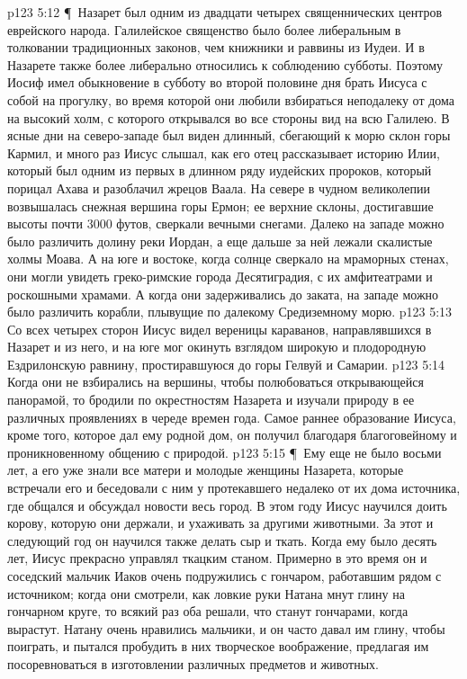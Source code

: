\vs p123 5:12 \P\ Назарет был одним из двадцати четырех священнических центров еврейского народа. Галилейское священство было более либеральным в толковании традиционных законов, чем книжники и раввины из Иудеи. И в Назарете также более либерально относились к соблюдению субботы. Поэтому Иосиф имел обыкновение в субботу во второй половине дня брать Иисуса с собой на прогулку, во время которой они любили взбираться неподалеку от дома на высокий холм, с которого открывался во все стороны вид на всю Галилею. В ясные дни на северо\hyp{}западе был виден длинный, сбегающий к морю склон горы Кармил, и много раз Иисус слышал, как его отец рассказывает историю Илии, который был одним из первых в длинном ряду иудейских пророков, который порицал Ахава и разоблачил жрецов Ваала. На севере в чудном великолепии возвышалась снежная вершина горы Ермон; ее верхние склоны, достигавшие высоты почти 3000 футов, сверкали вечными снегами. Далеко на западе можно было различить долину реки Иордан, а еще дальше за ней лежали скалистые холмы Моава. А на юге и востоке, когда солнце сверкало на мраморных стенах, они могли увидеть греко\hyp{}римские города Десятиградия, с их амфитеатрами и роскошными храмами. А когда они задерживались до заката, на западе можно было различить корабли, плывущие по далекому Средиземному морю.
\vs p123 5:13 Со всех четырех сторон Иисус видел вереницы караванов, направлявшихся в Назарет и из него, и на юге мог окинуть взглядом широкую и плодородную Ездрилонскую равнину, простиравшуюся до горы Гелвуй и Самарии.
\vs p123 5:14 Когда они не взбирались на вершины, чтобы полюбоваться открывающейся панорамой, то бродили по окрестностям Назарета и изучали природу в ее различных проявлениях в череде времен года. Самое раннее образование Иисуса, кроме того, которое дал ему родной дом, он получил благодаря благоговейному и проникновенному общению с природой.
\vs p123 5:15 \P\ Ему еще не было восьми лет, а его уже знали все матери и молодые женщины Назарета, которые встречали его и беседовали с ним у протекавшего недалеко от их дома источника, где общался и обсуждал новости весь город. В этом году Иисус научился доить корову, которую они держали, и ухаживать за другими животными. За этот и следующий год он научился также делать сыр и ткать. Когда ему было десять лет, Иисус прекрасно управлял ткацким станом. Примерно в это время он и соседский мальчик Иаков очень подружились с гончаром, работавшим рядом с источником; когда они смотрели, как ловкие руки Натана мнут глину на гончарном круге, то всякий раз оба решали, что станут гончарами, когда вырастут. Натану очень нравились мальчики, и он часто давал им глину, чтобы поиграть, и пытался пробудить в них творческое воображение, предлагая им посоревноваться в изготовлении различных предметов и животных.
